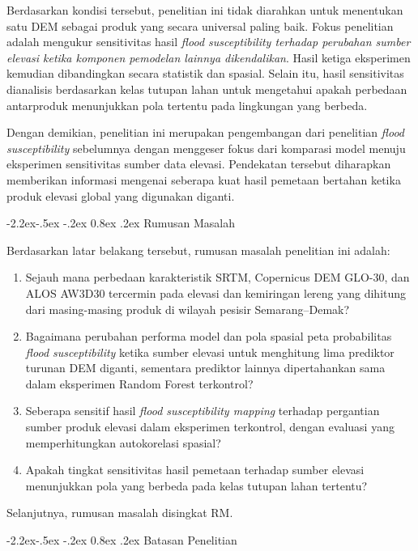 \documentclass[12pt,a4paper]{article}
\makeatletter
\renewcommand\subsection{\@startsection{subsection}{2}{\z@}%
  {-2.2ex\@plus -.5ex \@minus -.2ex}%
  {0.8ex \@plus .2ex}%
  {\normalfont\normalsize\bfseries}}
\makeatother
\begin{document}
Berdasarkan kondisi tersebut, penelitian ini tidak diarahkan untuk menentukan
satu DEM sebagai produk yang secara universal paling baik. Fokus penelitian
adalah mengukur sensitivitas hasil \textit{flood susceptibility
terhadap perubahan sumber elevasi ketika komponen pemodelan lainnya
dikendalikan}. Hasil ketiga eksperimen kemudian dibandingkan secara statistik
dan spasial. Selain itu, hasil sensitivitas dianalisis berdasarkan kelas
tutupan lahan untuk mengetahui apakah perbedaan antarproduk menunjukkan pola
tertentu pada lingkungan yang berbeda.

Dengan demikian, penelitian ini merupakan pengembangan dari penelitian
\textit{flood susceptibility} sebelumnya dengan menggeser fokus dari
komparasi model menuju eksperimen sensitivitas sumber data elevasi.
Pendekatan tersebut diharapkan memberikan informasi mengenai seberapa kuat
hasil pemetaan bertahan ketika produk elevasi global yang digunakan diganti.

\subsection{Rumusan Masalah}

Berdasarkan latar belakang tersebut, rumusan masalah penelitian ini adalah:

\begin{enumerate}
\item Sejauh mana perbedaan karakteristik SRTM, Copernicus DEM GLO-30, dan
ALOS AW3D30 tercermin pada elevasi dan kemiringan lereng yang dihitung
dari masing-masing produk di wilayah pesisir Semarang--Demak?
\item Bagaimana perubahan performa model dan pola spasial peta probabilitas
\textit{flood susceptibility} ketika sumber elevasi untuk menghitung lima
prediktor turunan DEM diganti, sementara prediktor lainnya dipertahankan sama
dalam eksperimen Random Forest terkontrol?
\item Seberapa sensitif hasil \textit{flood susceptibility mapping}
terhadap pergantian sumber produk elevasi dalam eksperimen terkontrol,
dengan evaluasi yang memperhitungkan autokorelasi spasial?
\item Apakah tingkat sensitivitas hasil pemetaan terhadap sumber elevasi
menunjukkan pola yang berbeda pada kelas tutupan lahan tertentu?
\end{enumerate}

Selanjutnya, rumusan masalah disingkat RM.

\subsection{Batasan Penelitian}
\end{document}
